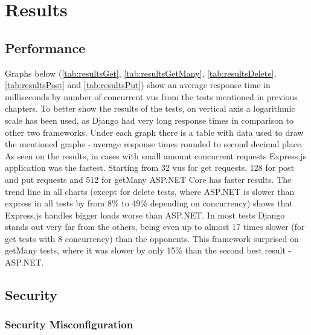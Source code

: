 
\chapter{Results}\label{cha:results}

\section{Performance}

Graphs below (\ref{tab:resultsGet}, \ref{tab:resultsGetMany}, \ref{tab:resultsDelete}, \ref{tab:resultsPost} and \ref{tab:resultsPut}) show an average response time in milliseconds by number of concurrent \acrshort{vu}s from the tests mentioned in previous chapters. To better show the results of the tests, on vertical axis a logarithmic scale has been used, as Django had very long response times in comparison to other two frameworks. Under each graph there is a table with data used to draw the mentioned graphs - average response times rounded to second decimal place. As seen on the results, in cases with small amount concurrent requests Express.js application was the fastest. Starting from 32 \acrlong{vu}s for get requests, 128 for post and put requests and 512 for getMany ASP.NET Core has faster results. The trend line in all charts (except for delete tests, where ASP.NET is slower than express in all tests by from 8\% to 49\% depending on concurrency) shows that Express.js handles bigger loads worse than ASP.NET. In most tests Django stands out very far from the others, being even up to almost 17 times slower (for get tests with 8 concurrency) than the opponents. This framework surprised on getMany tests, where it was slower by only 15\% than the second best result - ASP.NET.
















\section{Security}
\subsection{Security Misconfiguration}
